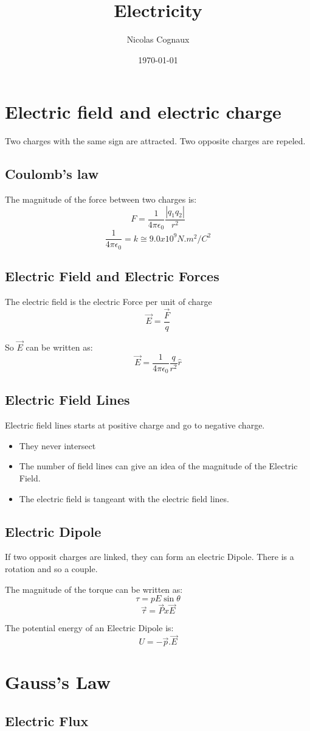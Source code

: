 \documentclass[11pt,a4paper,french]{article}
\title{Electricity}
\author{Nicolas Cognaux}
\date{\today}
\begin{document}
\maketitle

\section{Electric field and electric charge}
Two charges with the same sign are attracted. Two opposite charges are repeled.

\subsection{Coulomb's law}
The magnitude of the force between two charges is:
$$ F = \frac{1}{4\pi\epsilon_0}\frac{|q_1q_2|}{r^2} $$
$$ \frac{1}{4\pi\epsilon_0} = k \cong 9.0x10^9N.m^2/C^2$$


\subsection{Electric Field and Electric Forces}
The electric field is the electric Force per unit of charge
$$ \vec{E} = \frac{\vec{F}}{q} $$

So $\vec{E}$ can be written as:
$$ \vec{E} = \frac{1}{4\pi\epsilon_0}\frac{q}{r^2}\hat{r} $$

\subsection{Electric Field Lines}
Electric field lines starts at positive charge and go to negative charge.

\begin{itemize}
\item They never intersect
\item The number of field lines can give an idea of the magnitude of the Electric Field.
\item The electric field is tangeant with the electric field lines.
\end{itemize}

\subsection{Electric Dipole}
If two opposit charges are linked, they can form an electric Dipole. There is a rotation and so a couple.

The magnitude of the torque can be written as:
$$ \tau = pE\sin{\theta} $$
$$\vec{\tau} = \vec{P}x\vec{E} $$

The potential energy of an Electric Dipole is:
$$ U = -\vec{p}. \vec{E} $$

\section{Gauss's Law}
\subsection{Electric Flux}
\end{document}

